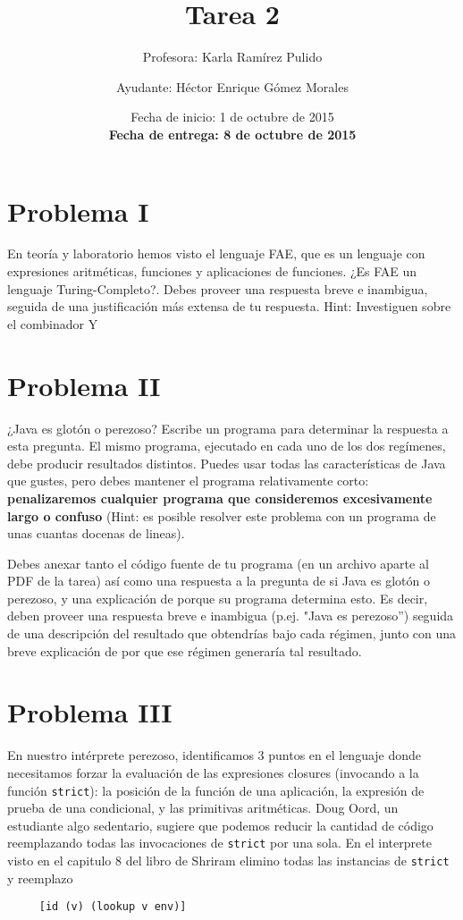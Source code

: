 \documentclass{article}
\author{Profesora: Karla Ramírez Pulido \and
  Ayudante: Héctor Enrique Gómez Morales}
\title{Tarea 2}
\date{Fecha de inicio: 1 de octubre de 2015\\
  \textbf{Fecha de entrega: 8 de octubre de 2015}}
\begin{document}
\maketitle
\section*{Problema I}
En teoría y laboratorio hemos visto el lenguaje FAE, que es un lenguaje
con expresiones aritméticas, funciones y aplicaciones de funciones.
¿Es FAE un lenguaje Turing-Completo?. Debes proveer una respuesta breve e inambigua, seguida de una justificación más extensa de tu respuesta.
Hint: Investiguen sobre el combinador Y

\section*{Problema II}
¿Java es glotón o perezoso? Escribe un programa para determinar la respuesta a esta
pregunta. El mismo programa, ejecutado en cada uno de los dos regímenes, debe
producir resultados distintos. Puedes usar todas las características de Java
que gustes, pero debes mantener el programa relativamente corto:
\textbf{penalizaremos cualquier programa que consideremos excesivamente
  largo o confuso} (Hint: es posible resolver este problema con un programa
de unas cuantas docenas de lineas).

Debes anexar tanto el código fuente de tu programa (en un archivo aparte al PDF de
la tarea) así como una respuesta a la pregunta de si Java es glotón o perezoso,
y una explicación de porque su programa determina esto. Es decir, deben proveer una
respuesta breve e inambigua (p.ej. "Java es perezoso'') seguida de una descripción
del resultado que obtendrías bajo cada régimen, junto con una breve explicación
de por que ese régimen generaría tal resultado.

\section*{Problema III}
En nuestro intérprete perezoso, identificamos 3 puntos en el lenguaje donde
necesitamos forzar la evaluación de las expresiones closures (invocando a la
función \texttt{strict}): la posición de la función de una aplicación,
la expresión de prueba de una condicional, y las primitivas aritméticas.
Doug Oord, un estudiante algo sedentario, sugiere que podemos reducir
la cantidad de código reemplazando todas las invocaciones de \texttt{strict}
por una sola. En el interprete visto en el capitulo 8 del libro de Shriram
elimino todas las instancias de \texttt{strict} y reemplazo
\begin{verbatim}
     [id (v) (lookup v env)]
\end{verbatim}
\end{document}
